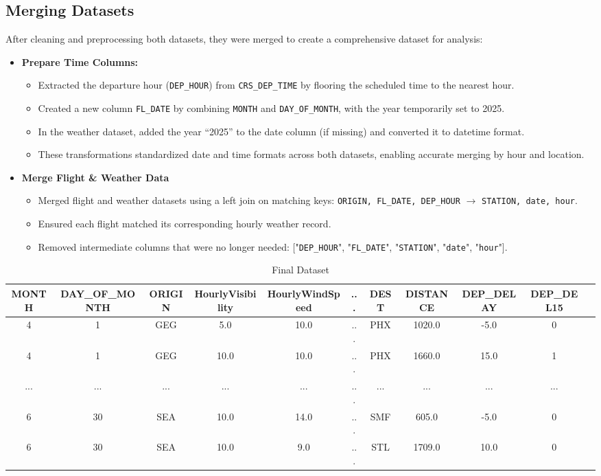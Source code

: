 \documentclass[a4paper,12pt]{report}
\begin{document}
\subsection{Merging Datasets}
After cleaning and preprocessing both datasets, they were merged to create a comprehensive dataset for analysis:
\begin{itemize}
    \item \textbf{Prepare Time Columns:}
    \begin{itemize}
        \item{Extracted the departure hour (\texttt{DEP\_HOUR}) from \texttt{CRS\_DEP\_TIME} by flooring the scheduled time to the nearest hour.}
        \item {Created a new column \texttt{FL\_DATE} by combining \texttt{MONTH} and \texttt{DAY\_OF\_MONTH}, with the year temporarily set to 2025.}
        \item {In the weather dataset, added the year “2025” to the date column (if missing) and converted it to datetime format.}
        \item {These transformations standardized date and time formats across both datasets, enabling accurate merging by hour and location.}
    \end{itemize}
    \item \textbf{Merge Flight \& Weather Data}
    \begin{itemize}
        \item{Merged flight and weather datasets using a left join on matching keys:
    \texttt{ORIGIN, FL\_DATE, DEP\_HOUR} $\rightarrow$ \texttt{STATION, date, hour}.}
        \item{Ensured each flight matched its corresponding hourly weather record.}
        \item {Removed intermediate columns that were no longer needed: ["\texttt{DEP\_HOUR}", "\texttt{FL\_DATE}", "\texttt{STATION}", "\texttt{date}", "\texttt{hour}"].}
    \end{itemize}
\end{itemize}

\begin{table}[H]
\centering
\begin{adjustbox}{width=\textwidth}
\begin{tabular}{|c|c|c|c|c|c|c|c|c|c|c|}
\hline
\textbf{MONTH} & \textbf{DAY\_OF\_MONTH} & \textbf{ORIGIN} & \textbf{HourlyVisibility} & \textbf{HourlyWindSpeed} & \textbf{...} & \textbf{DEST} & \textbf{DISTANCE} & \textbf{DEP\_DELAY} & \textbf{DEP\_DEL15}\\
\hline
4 & 1 & GEG & 5.0 & 10.0 & ... & PHX & 1020.0 & -5.0 & 0\\
4 & 1 & GEG & 10.0 & 10.0 & ... & PHX & 1660.0 & 15.0 & 1\\
... & ... & ... & ... & ... & ... & ... & ... & ... & ...\\
6 & 30 & SEA & 10.0 & 14.0 & ... & SMF & 605.0 & -5.0 & 0\\
6 & 30 & SEA & 10.0 & 9.0 & ... & STL & 1709.0 & 10.0 & 0\\
\hline
\end{tabular}
\end{adjustbox}
\caption{Final Dataset}
\end{table}
\end{document}

